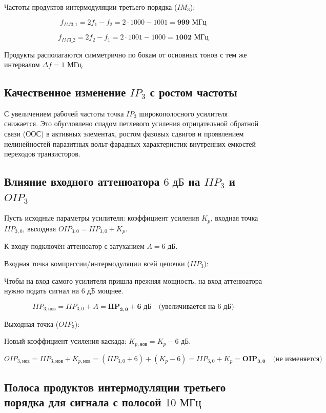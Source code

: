Частоты продуктов интермодуляции третьего порядка ($IM_3$):

$$f_{IM3\_1} = 2f_1 - f_2 = 2 \cdot 1000 - 1001 = \mathbf{999\text{ МГц}}$$

$$f_{IM3\_2} = 2f_2 - f_1 = 2 \cdot 1001 - 1000 = \mathbf{1002\text{ МГц}}$$

Продукты располагаются симметрично по бокам от основных тонов с тем же интервалом $\Delta f = 1\text{ МГц}$.

\subsection {Качественное изменение $IP_3$ с ростом частоты}

С увеличением рабочей частоты точка $IP_3$ широкополосного усилителя снижается. Это обусловлено спадом петлевого усиления отрицательной обратной связи (ООС) в активных элементах, ростом фазовых сдвигов и проявлением нелинейностей паразитных вольт-фарадных характеристик внутренних емкостей переходов транзисторов.

\subsection {Влияние входного аттенюатора $6\text{ дБ}$ на $IIP_3$ и $OIP_3$}

Пусть исходные параметры усилителя: коэффициент усиления $K_p$, входная точка $IIP_{3,0}$, выходная $OIP_{3,0} = IIP_{3,0} + K_p$.

К входу подключён аттенюатор с затуханием $A = 6\text{ дБ}$.

Входная точка компрессии/интермодуляции всей цепочки ($IIP_3$):

Чтобы на вход самого усилителя пришла прежняя мощность, на вход аттенюатора нужно подать сигнал на $6\text{ дБ}$ мощнее.

$$IIP_{3,\text{нов}} = IIP_{3,0} + A = \mathbf{IIP_{3,0} + 6\text{ дБ}}\quad \text{(увеличивается на 6 дБ)}$$

Выходная точка ($OIP_3$):

Новый коэффициент усиления каскада: $K_{p,\text{нов}} = K_p - 6\text{ дБ}$.

$$OIP_{3,\text{нов}} = IIP_{3,\text{нов}} + K_{p,\text{нов}} = (IIP_{3,0} + 6) + (K_p - 6) = IIP_{3,0} + K_p = \mathbf{OIP_{3,0}}\quad \text{(не изменяется)}$$

\subsection {Полоса продуктов интермодуляции третьего порядка для сигнала с полосой $10\text{ МГц}$}


